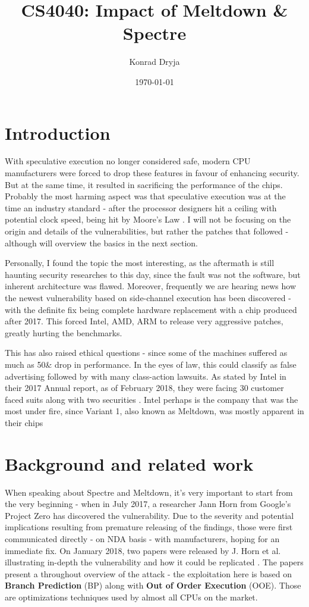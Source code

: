 \documentclass{csfourzero}
\title{CS4040: Impact of Meltdown \& Spectre}
\author{Konrad Dryja}
\date{\today}
\begin{document}
\maketitle


\section{Introduction}
\label{sec:intro}
With speculative execution no longer considered safe, modern CPU manufacturers were forced to drop these features in favour of enhancing security. But at the same time, it resulted in sacrificing the performance of the chips. Probably the most harming aspect was that speculative execution was at the time an industry standard - after the processor designers hit a ceiling with potential clock speed, being hit by Moore's Law \cite{schaller1997moore}. I will not be focusing on the origin and details of the vulnerabilities, but rather the patches that followed - although will overview the basics in the next section.  

Personally, I found the topic the most interesting, as the aftermath is still haunting security researches to this day, since the fault was not the software, but inherent architecture was flawed. Moreover, frequently we are hearing news how the newest vulnerability based on side-channel execution has been discovered - with the definite fix being complete hardware replacement with a chip produced after 2017. This forced Intel, AMD, ARM to release very aggressive patches, greatly hurting the benchmarks.

This has also raised ethical questions - since some of the machines suffered as much as 50\& drop in performance. In the eyes of law, this could classify as false advertising followed by with many class-action lawsuits. As stated by Intel in their 2017 Annual report, as of February 2018, they were facing 30 customer faced suits along with two securities \cite{intelreport}. Intel perhaps is the company that was the most under fire, since Variant 1, also known as Meltdown, was mostly apparent in their chips 

\section{Background and related work}
\label{sec:lit}

When speaking about Spectre and Meltdown, it's very important to start from the very beginning - when in July 2017, a researcher Jann Horn from Google's Project Zero has discovered the vulnerability. Due to the severity and potential implications resulting from premature releasing of the findings, those were first communicated directly - on NDA basis - with manufacturers, hoping for an immediate fix. On January 2018, two papers were released by J. Horn et al. illustrating in-depth the vulnerability and how it could be replicated \cite{Lipp2018meltdown, Kocher2018spectre}. The papers present a throughout overview of the attack - the exploitation here is based on \textbf{Branch Prediction} (BP) along with \textbf{Out of Order Execution} (OOE). Those are optimizations techniques used by almost all CPUs on the market.
\end{document}
